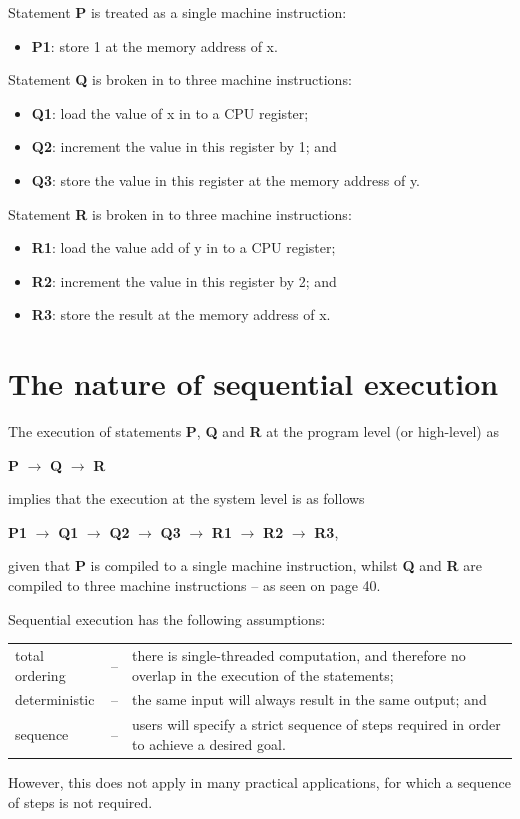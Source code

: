 \documentclass[a4paper]{systems-software}
\begin{document}
Statement \textbf{P} is treated as a single machine instruction:
\begin{itemize}
	\item \textbf{P1}: store 1 at the memory address of x.
\end{itemize}

Statement \textbf{Q} is broken in to three machine instructions:
\begin{itemize}
	\item \textbf{Q1}: load the value of x in to a CPU register;
	\item \textbf{Q2}: increment the value in this register by 1; and
	\item \textbf{Q3}: store the value in this register at the memory address of y.
\end{itemize}

Statement \textbf{R} is broken in to three machine instructions:
\begin{itemize}
	\item \textbf{R1}: load the value add of y in to a CPU register;
	\item \textbf{R2}: increment the value in this register by 2; and
	\item \textbf{R3}: store the result at the memory address of x.
\end{itemize}


\section*{The nature of sequential execution}

The execution of statements \textbf{P}, \textbf{Q} and \textbf{R} at the program level (or high-level) as

	\indent \textbf{P} $\rightarrow$ \textbf{Q} $\rightarrow$ \textbf{R}
	
implies that the execution at the system level is as follows

	\indent \textbf{P1} $\rightarrow$ \textbf{Q1} $\rightarrow$ \textbf{Q2} $\rightarrow$ \textbf{Q3} $\rightarrow$ \textbf{R1} $\rightarrow$ \textbf{R2} $\rightarrow$ \textbf{R3},
	
given that \textbf{P} is compiled to a single machine instruction, whilst \textbf{Q} and \textbf{R} are compiled to three machine instructions – as seen on page 40.

Sequential execution has the following assumptions:
\begin{longtabu} to \textwidth { X[1.7,l] X[0.2,l] X[7,l]}
	\textbullet total ordering & -- &
	there is single-threaded computation, and therefore no overlap in the execution of the statements;
	\\
	\textbullet deterministic & -- &
	the same input will always result in the same output; and
	\\
	\textbullet sequence & -- &
	users will specify a strict sequence of steps required in order to achieve a desired goal.
\end{longtabu}
However, this does not apply in many practical applications, for which a sequence of steps is not required.
\end{document}
